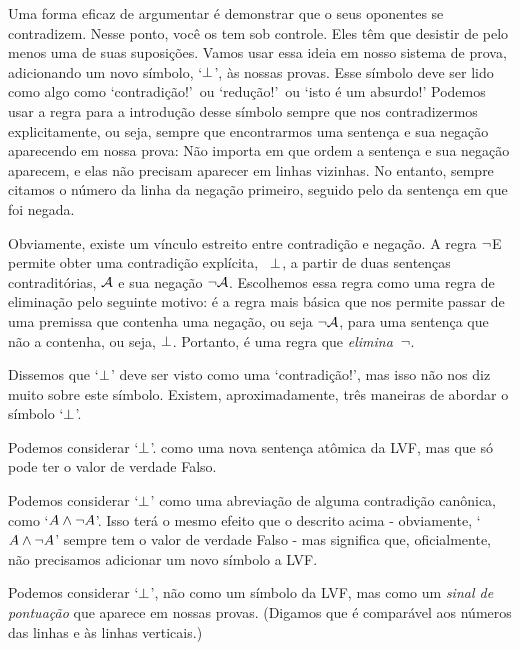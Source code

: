 Uma forma eficaz de argumentar \'e demonstrar que o seus oponentes se contradizem. Nesse ponto, voc\^e os tem sob controle. Eles t\^em que desistir de pelo menos uma de suas suposi\c c\~oes. Vamos usar essa ideia em nosso sistema de prova, adicionando um novo s\'imbolo, `$\bot$', \`as nossas provas. Esse s\'imbolo deve ser lido como algo como `contradi\c c\~ao!'\ ou `redu\c c\~ao!'\ ou `isto \'e um absurdo!'  Podemos usar   a regra para a introdu\c c\~ao desse s\'imbolo sempre que nos contradizermos explicitamente, ou seja, sempre que encontrarmos uma senten\c ca e sua nega\c c\~ao aparecendo em nossa prova:
N\~ao importa em que ordem a senten\c ca e sua nega\c c\~ao aparecem, e elas n\~ao precisam aparecer em linhas vizinhas. No entanto, sempre citamos o n\'umero da linha da nega\c c\~ao primeiro, seguido pelo da senten\c ca em que foi negada.

Obviamente, existe um v\'inculo estreito entre contradi\c c\~ao e nega\c c\~ao. 
A regra $\neg$E permite obter uma contradi\c c\~ao expl\'icita, ~$\bot$,  
 a partir de duas senten\c cas contradit\'orias, $\mathcal{A}$ e sua nega\c c\~ao $\neg \mathcal{A}$. 
Escolhemos essa regra como uma regra de elimina\c c\~ao pelo seguinte  motivo: \'e a regra mais b\'asica que nos permite passar de uma premissa que contenha uma nega\c c\~ao, ou seja $\neg\mathcal{A}$, 
para uma senten\c ca que n\~ao a contenha, ou seja,  $\bot$.  Portanto, \'e uma regra que \emph{elimina}~$\neg$.


Dissemos que  `$\bot$'  deve ser visto como uma  `contradi\c c\~ao!', mas isso n\~ao nos diz muito sobre este s\'imbolo. Existem, aproximadamente, tr\^es maneiras de abordar o s\'imbolo `$\bot$'.
	\begin{ebullet}
		\item Podemos considerar `$\bot$'. como uma nova senten\c ca at\^omica da LVF, mas que s\'o pode ter o valor de verdade Falso.  
		\item Podemos considerar  `$\bot$' como uma abrevia\c c\~ao de alguma contradi\c c\~ao can\^onica, como `$A \wedge \neg A$'. Isso ter\'a o mesmo efeito que o descrito acima - obviamente, `$A \wedge \neg A$' sempre tem o valor de verdade Falso - mas significa que, oficialmente, n\~ao precisamos adicionar um novo s\'imbolo a LVF.
		\item Podemos considerar `$\bot$', n\~ao como um s\'imbolo da LVF, mas como um \emph{sinal de pontua\c c\~ao} que aparece em nossas provas.  (Digamos que \'e compar\'avel aos n\'umeros das linhas e \`as linhas verticais.)
			\end{ebullet}
			
